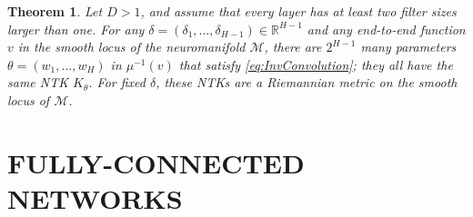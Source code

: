 \documentclass[twoside]{article}
\newtheorem{theorem}{Theorem}
\theoremstyle{definition}
\theoremstyle{remark}
\begin{document}
\begin{theorem}\label{thm:mainHigherDimension}
        Let $D >1$, and assume that every layer
    has at least two filter sizes larger than one.
    For any    $\delta = (\delta_1, \ldots, \delta_{H-1}) \in \mathbb{R}^{H-1}$ and any end-to-end function $v$ in the smooth locus of the neuromanifold $\mathcal{M}$, there are $2^{H-1}$ many parameters $\theta = (w_1, \ldots, w_H)$ in $\mu^{-1}(v)$ that satisfy \eqref{eq:InvConvolution}; they all have the same NTK $K_\theta$. 
    For fixed $\delta$, these NTKs are a Riemannian metric on the smooth locus of $\mathcal{M}$.
\end{theorem}



\section{FULLY-CONNECTED NETWORKS}
\label{sec:fullyConn}
\end{document}
